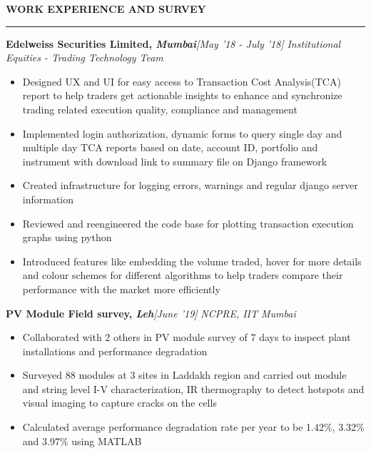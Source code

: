 \documentclass[10 pt]{article}%
\begin{document}
\vspace*{4.2cm}
\begin{flushleft}\bf{\Large{\textcolor{color2}{WORK EXPERIENCE AND SURVEY}}}\end{flushleft}
\vspace{-5pt}
\hrule
\vspace{1 pt}
{\flushleft \textbf {\large{Edelweiss Securities Limited, \em{Mumbai}}}}\hfill {{{\em{[May '18 - July '18]}}}}
\vspace{-0.8em}
{\flushleft \em{Institutional Equities - Trading Technology Team}}
\vspace{-5pt}
\begin{itemize}[leftmargin=*]
    \setlength\itemsep{1.5pt}
    \setlength\parskip{1.5pt}
    \item Designed UX and UI for easy access to Transaction Cost Analysis(TCA) report to help traders get actionable insights to enhance and synchronize trading related execution quality, compliance and management
	\item Implemented login authorization, dynamic forms to query single day and multiple day TCA reports based on date, account ID, portfolio and instrument with download link to summary file on Django framework
	\item Created infrastructure for logging errors, warnings and regular django server information
	\item Reviewed and reengineered the code base for plotting transaction execution graphs using python
	\item Introduced features like embedding the volume traded, hover for more details and colour schemes for different algorithms to help traders compare their performance with the market more efficiently
\end{itemize}

{\flushleft \bf {\large{PV Module Field survey,  \em{Leh}}}}\hfill {{{\em{[June '19]}}}}
\vspace{-0.8em}
{\flushleft \em{NCPRE, IIT Mumbai}}
\vspace{-5pt}
\begin{itemize}[leftmargin=*]
\setlength\itemsep{1.5pt}
\setlength\parskip{1.5pt}
\item Collaborated with 2 others in PV module survey of 7 days to inspect plant installations and performance degradation
\item Surveyed 88 modules at 3 sites in Laddakh region and carried out module and string level I-V characterization, IR thermography to detect hotspots and visual imaging to capture cracks on the cells
\item Calculated average performance degradation rate per year to be  1.42\%, 3.32\% and 3.97\% using MATLAB
\end{itemize}
\end{document}
